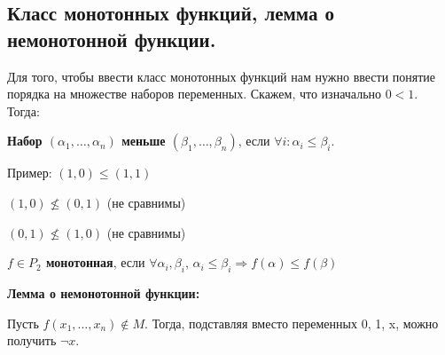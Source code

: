 \subsection{Класс монотонных функций, лемма о немонотонной функции.}

   Для того, чтобы ввести класс монотонных функций нам нужно ввести понятие порядка на множестве наборов переменных. Скажем, что изначально $0 < 1$. Тогда:

   \textbf{Набор $(\alpha_1, \ldots, \alpha_n)$ меньше $(\beta_1, \ldots, \beta_n)$}, если $\forall i \colon \alpha_i \le \beta_i$.

   Пример: $(1, 0) \le (1, 1)$

   $(1, 0) \nleq (0, 1)$ (не сравнимы)

   $(0, 1) \nleq (1, 0)$ (не сравнимы)

   \textbf{$f \in P_2$ монотонная}, если $\forall \alpha_i, \beta_i$, $\alpha_i \le \beta_i \Rightarrow f(\alpha) \le f(\beta)$

    \textbf{Лемма о немонотонной функции:}

   Пусть $f (x_1, \ldots, x_n) \notin M$. Тогда, подставляя вместо переменных 0, 1, x, можно получить $\neg x$.

